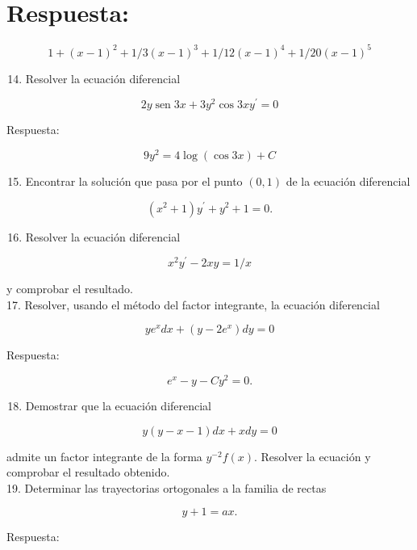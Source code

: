 \documentclass[10pt]{article}
\theoremstyle{plain}
\theoremstyle{definition}
\theoremstyle{remark}
\begin{document}
\section*{Respuesta:}
$$
1+(x-1)^{2}+1 / 3(x-1)^{3}+1 / 12(x-1)^{4}+1 / 20(x-1)^{5}
$$

\begin{enumerate}
  \setcounter{enumi}{13}
  \item Resolver la ecuación diferencial
\end{enumerate}

$$
2 y \operatorname{sen} 3 x+3 y^{2} \cos 3 x y^{\prime}=0
$$

Respuesta:

$$
9 y^{2}=4 \log (\cos 3 x)+C
$$

\begin{enumerate}
  \setcounter{enumi}{14}
  \item Encontrar la solución que pasa por el punto $(0,1)$ de la ecuación diferencial
\end{enumerate}

$$
\left(x^{2}+1\right) y^{\prime}+y^{2}+1=0 .
$$

\begin{enumerate}
  \setcounter{enumi}{15}
  \item Resolver la ecuación diferencial
\end{enumerate}

$$
x^{2} y^{\prime}-2 x y=1 / x
$$

y comprobar el resultado.\\
17. Resolver, usando el método del factor integrante, la ecuación diferencial

$$
y e^{x} d x+\left(y-2 e^{x}\right) d y=0
$$

Respuesta:

$$
e^{x}-y-C y^{2}=0 .
$$

\begin{enumerate}
  \setcounter{enumi}{17}
  \item Demostrar que la ecuación diferencial
\end{enumerate}

$$
y(y-x-1) d x+x d y=0
$$

admite un factor integrante de la forma $y^{-2} f(x)$. Resolver la ecuación y comprobar el resultado obtenido.\\
19. Determinar las trayectorias ortogonales a la familia de rectas

$$
y+1=a x .
$$

Respuesta:
\end{document}
